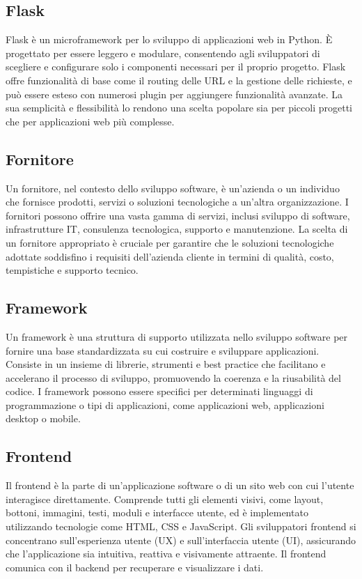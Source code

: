 \vspace{2em}
\subsection*{Flask}
\par Flask è un microframework per lo sviluppo di applicazioni web in Python. È progettato per essere leggero e modulare, consentendo agli sviluppatori di scegliere e configurare solo i componenti necessari per il proprio progetto. Flask offre funzionalità di base come il routing delle URL e la gestione delle richieste, e può essere esteso con numerosi plugin per aggiungere funzionalità avanzate. La sua semplicità e flessibilità lo rendono una scelta popolare sia per piccoli progetti che per applicazioni web più complesse.

\vspace{2em}
\subsection*{Fornitore}
\par Un fornitore, nel contesto dello sviluppo software, è un'azienda o un individuo che fornisce prodotti, servizi o soluzioni tecnologiche a un'altra organizzazione. I fornitori possono offrire una vasta gamma di servizi, inclusi sviluppo di software, infrastrutture IT, consulenza tecnologica, supporto e manutenzione. La scelta di un fornitore appropriato è cruciale per garantire che le soluzioni tecnologiche adottate soddisfino i requisiti dell'azienda cliente in termini di qualità, costo, tempistiche e supporto tecnico.

\vspace{2em}
\subsection*{Framework}
\par Un framework è una struttura di supporto utilizzata nello sviluppo software per fornire una base standardizzata su cui costruire e sviluppare applicazioni. Consiste in un insieme di librerie, strumenti e best practice che facilitano e accelerano il processo di sviluppo, promuovendo la coerenza e la riusabilità del codice. I framework possono essere specifici per determinati linguaggi di programmazione o tipi di applicazioni, come applicazioni web, applicazioni desktop o mobile.

\vspace{2em}
\subsection*{Frontend}
\par Il frontend è la parte di un'applicazione software o di un sito web con cui l'utente interagisce direttamente. Comprende tutti gli elementi visivi, come layout, bottoni, immagini, testi, moduli e interfacce utente, ed è implementato utilizzando tecnologie come HTML, CSS e JavaScript. Gli sviluppatori frontend si concentrano sull'esperienza utente (UX) e sull'interfaccia utente (UI), assicurando che l'applicazione sia intuitiva, reattiva e visivamente attraente. Il frontend comunica con il backend per recuperare e visualizzare i dati.
